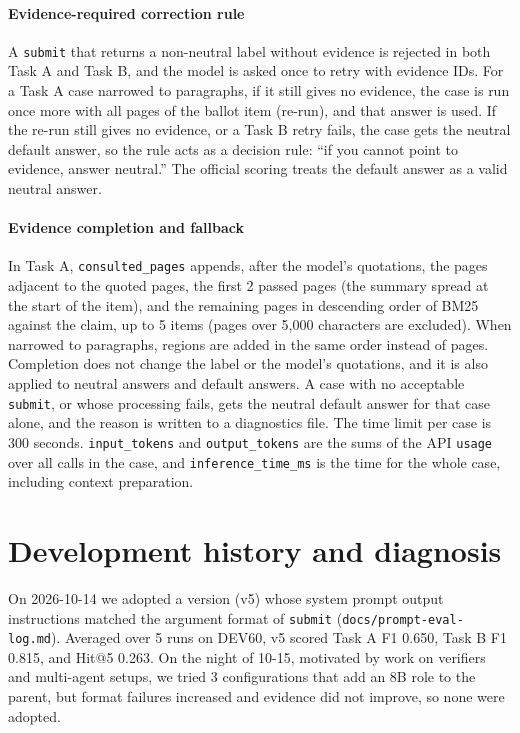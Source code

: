\documentclass[10pt,a4paper]{article}
\begin{document}
\paragraph{Evidence-required correction rule}
A \texttt{submit} that returns a non-neutral label without evidence is rejected in both Task A and Task B, and the model is asked once to retry with evidence IDs.
For a Task A case narrowed to paragraphs, if it still gives no evidence, the case is run once more with all pages of the ballot item (re-run), and that answer is used.
If the re-run still gives no evidence, or a Task B retry fails, the case gets the neutral default answer, so the rule acts as a decision rule: ``if you cannot point to evidence, answer neutral.''
The official scoring treats the default answer as a valid neutral answer.

\paragraph{Evidence completion and fallback}
In Task A, \texttt{consulted\_pages} appends, after the model's quotations, the pages adjacent to the quoted pages, the first 2 passed pages (the summary spread at the start of the item), and the remaining pages in descending order of BM25 against the claim, up to 5 items (pages over 5,000 characters are excluded). When narrowed to paragraphs, regions are added in the same order instead of pages.
Completion does not change the label or the model's quotations, and it is also applied to neutral answers and default answers.
A case with no acceptable \texttt{submit}, or whose processing fails, gets the neutral default answer for that case alone, and the reason is written to a diagnostics file. The time limit per case is 300 seconds.
\texttt{input\_tokens} and \texttt{output\_tokens} are the sums of the API \texttt{usage} over all calls in the case, and \texttt{inference\_time\_ms} is the time for the whole case, including context preparation.

\section{Development history and diagnosis}

On 2026-10-14 we adopted a version (v5) whose system prompt output instructions matched the argument format of \texttt{submit} (\texttt{docs/prompt-eval-log.md}). Averaged over 5 runs on DEV60, v5 scored Task A F1 0.650, Task B F1 0.815, and Hit@5 0.263.
On the night of 10-15, motivated by work on verifiers and multi-agent setups\cite{dhuliawala2023cove,huang2024selfcorrect,du2023debate,smit2024mad}, we tried 3 configurations that add an 8B role to the parent, but format failures increased and evidence did not improve, so none were adopted.
\end{document}
